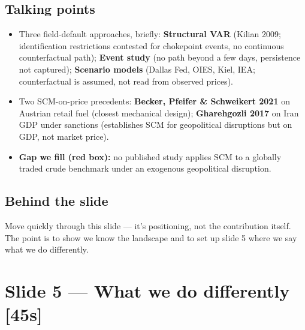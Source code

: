 \documentclass[11pt,a4paper]{article}
\newcommand{\timetag}[1]{\hfill\textcolor{muted}{\small[#1]}}
\newcommand{\highlight}[1]{\textcolor{accent}{\textbf{#1}}}
\begin{document}
\subsection{Talking points}
\begin{itemize}
  \item Three field-default approaches, briefly: \textbf{Structural VAR} (Kilian 2009; identification restrictions contested for chokepoint events, no continuous counterfactual path); \textbf{Event study} (no path beyond a few days, persistence not captured); \textbf{Scenario models} (Dallas Fed, OIES, Kiel, IEA; counterfactual is assumed, not read from observed prices).
  \item Two SCM-on-price precedents: \textbf{Becker, Pfeifer \& Schweikert 2021} on Austrian retail fuel (closest mechanical design); \textbf{Gharehgozli 2017} on Iran GDP under sanctions (establishes SCM for geopolitical disruptions but on GDP, not market price).
  \item \highlight{Gap we fill (red box):} no published study applies SCM to a globally traded crude benchmark under an exogenous geopolitical disruption.
\end{itemize}

\subsection{Behind the slide}
Move quickly through this slide --- it's positioning, not the contribution itself. The point is to show we know the landscape and to set up slide 5 where we say what we do differently.

\section{Slide 5 --- What we do differently \timetag{45s}}
\end{document}
